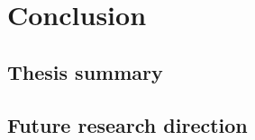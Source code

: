 \chapter{Conclusion}
\label{chapter:conclusion}
\ifpdf
    \graphicspath{{Chapter3/Figs/Raster/}{Chapter3/Figs/PDF/}{Chapter3/Figs/}}
\else
    \graphicspath{{Chapter3/Figs/Vector/}{Chapter3/Figs/}}
\fi


\section{Thesis summary}


\section{Future research direction}

